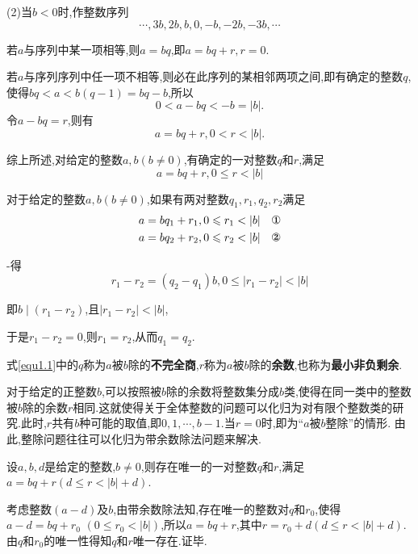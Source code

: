 (2)当$b<0$时,作整数序列
\begin{equation*}
	\cdots,3b,2b,b,0,-b,-2b,-3b,\cdots
\end{equation*}

若$a$与序列中某一项相等,则$a=bq$,即$a=bq+r,r=0$.

若$a$与序列序列中任一项不相等,则必在此序列的某相邻两项之间,即有确定的整数$q$,使得$bq<a<b(q-1)=bq-b$,所以
\begin{equation*}
	0<a-bq<-b=|b|.
\end{equation*}
令$a-bq=r$,则有
\begin{equation*}
	a=bq+r,0<r<|b|.
\end{equation*}

综上所述,对给定的整数$a,b(b\neq0)$,有确定的一对整数$q$和$r$,满足
\begin{equation*}
	a=bq+r,0\leqslant r<|b|
\end{equation*}

对于给定的整数$a,b(b\neq0)$,如果有两对整数$q_{1},r_{1},q_{2},r_{2}$满足
\begin{equation*}
	\begin{aligned}
		&a=bq_{1}+r_{1},0\leqslant r_{1}<|b|\quad\text{\ding{172}}\\
		&a=bq_{2}+r_{2},0\leqslant r_{2}<|b|\quad\text{\ding{173}}
	\end{aligned}
\end{equation*}

-得
\begin{equation*}
	r_{1}-r_{2}=(q_{2}-q_{1})b,0\leqslant|r_{1}-r_{2}|<|b|
\end{equation*}

即$b\mid(r_{1}-r_{2})$,且$|r_{1}-r_{2}|<|b|$,

于是$r_{1}-r_{2}=0$,则$r_{1}=r_{2}$,从而$q_{1}=q_{2}$.

 式\eqref{equ1.1}中的$q$称为$a$被$b$除的\textbf{不完全商},$r$称为$a$被$b$除的\textbf{余数},也称为\textbf{最小非负剩余}.

\remark 对于给定的正整数$b$,可以按照被$b$除的余数将整数集分成$b$类,使得在同一类中的整数被$b$除的余数$r$相同.这就使得关于全体整数的问题可以化归为对有限个整数类的研究.此时,$r$共有$b$种可能的取值,即$0,1, \cdots, b-1$.当$r=0$时,即为“$a$被$b$整除”的情形. 由此,整除问题往往可以化归为带余数除法问题来解决.

\corollary 设$a,b,d$是给定的整数,$b\neq 0$,则存在唯一的一对整数$q$和$r$,满足$a=bq+r(d\leqslant r<|b|+d)$.

\proof 考虑整数$(a-d)$及$b$,由带余数除法知,存在唯一的整数对$q$和$r_{0}$,使得$a-d=b q+r_{0}$ $\left(0 \leqslant r_{0}<|b|\right)$,所以$a=b q+r$,其中$r=r_{0}+d(d \leqslant r<|b|+d)$.由$q$和$r_{0}$的唯一性得知$q$和$r$唯一存在.证毕.

